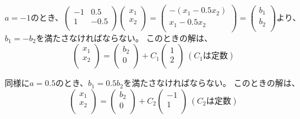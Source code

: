 \documentclass[]{jsarticle}
\begin{document}
        $a = -1$のとき、$
        \begin{pmatrix}
            -1 & 0.5 \\
            1 & -0.5 \\
        \end{pmatrix}\begin{pmatrix}
            x_1 \\
            x_2 \\
        \end{pmatrix} = \begin{pmatrix}
            -(x_1 - 0.5x_2) \\
            x_1 - 0.5x_2 \\
        \end{pmatrix} = \begin{pmatrix}
            b_1 \\
            b_2 \\
        \end{pmatrix}
        $より、$b_1 = -b_2$を満たさなければならない。
        このときの解は、
        \begin{equation*}
            \begin{pmatrix}
                x_1 \\
                x_2 \\
            \end{pmatrix} = \begin{pmatrix}
                b_2 \\
                0 \\
            \end{pmatrix} + C_1\begin{pmatrix}
                1 \\
                2 \\
            \end{pmatrix} \ (C_1は定数)
        \end{equation*}

        同様に$a = 0.5$のとき、$b_1 = 0.5b_2$を満たさなければならない。
        このときの解は、
        \begin{equation*}
            \begin{pmatrix}
                x_1 \\
                x_2 \\
            \end{pmatrix} = \begin{pmatrix}
                b_2 \\
                0 \\
            \end{pmatrix} + C_2\begin{pmatrix}
                -1 \\
                1 \\
            \end{pmatrix} \ (C_2は定数)
        \end{equation*}
\end{document}
